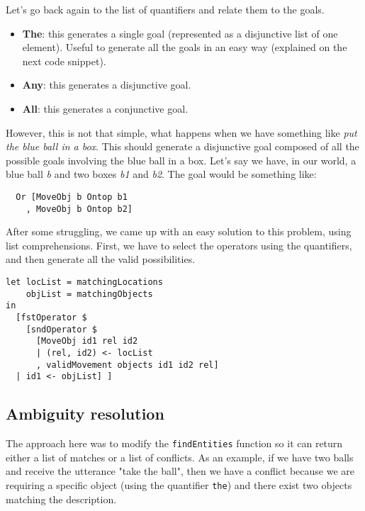 \documentclass[11pt]{article}
\begin{document}
          Let's go back again to the list of quantifiers and relate them to the goals.

          \begin{itemize}
            \item {\bf The}: this generates a single goal (represented as a disjunctive
            list of one element). Useful to generate all the goals in an easy way
            (explained on the next code snippet).
            \item {\bf Any}: this generates a disjunctive goal.
            \item {\bf All}: this generates a conjunctive goal.
          \end{itemize}

          However, this is not that simple, what happens when we have something like 
          \textit{put the blue ball in a box}. This should generate a disjunctive goal
          composed of all the possible goals involving the blue ball in a box. Let's say
          we have, in our world, a blue ball \textit{b} and two boxes \textit{b1} and \textit{b2}. The goal would be something like:

\begin{lstlisting}
  Or [MoveObj b Ontop b1
    , MoveObj b Ontop b2]
\end{lstlisting}

          After some struggling, we came up with an easy solution to this problem, using list comprehensions.
          First, we have to select the operators using the quantifiers, and then generate all the valid possibilities.

\begin{lstlisting}
let locList = matchingLocations
    objList = matchingObjects
in
  [fstOperator $
    [sndOperator $ 
      [MoveObj id1 rel id2
      | (rel, id2) <- locList
      , validMovement objects id1 id2 rel]
  | id1 <- objList] ]
\end{lstlisting}
	
        \subsection{Ambiguity resolution}
          The approach here was to modify the \texttt{findEntities} function so 
          it can return either a list of matches or a list of conflicts. As an 
          example, if we have two balls and receive the utterance "take the 
          ball", then we have a conflict because we are requiring a specific 
          object (using the quantifier \texttt{the}) and there exist two 
          objects matching the description.
\end{document}
